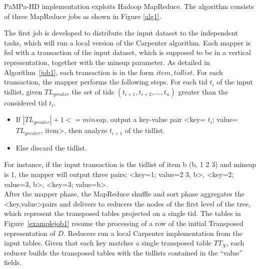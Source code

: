



PaMPa-HD implementation exploits Hadoop MapReduce.
The algorithm consists of three MapReduce jobs as shown in Figure \ref{alg1}.

The first job is developed to distribute the input dataset to the independent tasks,
which will run a local version of the Carpenter algorithm. Each mapper is fed
with a transaction of the input dataset, which is supposed to be in a vertical
representation, together with the minsup parameter. As detailed in Algorithm~\ref{job1}, each transaction is in the form $item,tidlist$. 
For each transaction, the mapper performs 
the following steps. For each tid $t_{i}$ of the input tidlist, given $TL_{greater}$ the set of tids $(t_{i+1},t_{i+2},...,t_{n})$ greater than the considered tid $t_{i}$.
\begin{itemize}
\item If $|TL_{greater}|+1 <= minsup$, output a key-value pair \textless key= $t_{i}$; value= $TL_{greater}$, item\textgreater, then analyze $t_{i+1}$ of the tidlist.
 \item Else discard the tidlist.
\end {itemize}
 For instance, if the input transaction is the tidlist of item b (b, 1 2 3) and
 minsup is 1, the mapper will output three pairs:  \textless key=1; value=2 3,
 b\textgreater,  \textless  key=2; value=3, b\textgreater,  \textless  key=3;
 value=b\textgreater .\\
 After the mapper phase, the MapReduce shuffle and sort phase aggregates the
 \textless key,value\textgreater pairs and delivers to reducers the nodes of the
 first level of the tree, which represent the transposed tables projected on a
 single tid. The tables in Figure~\ref{examplejob1} resume the processing of a row of the initial Transposed  representation of $D$.
 Reducers run a local Carpenter implementation from the input
 tables. Given that each key matches a single transposed table $TT_{X}$, each reducer builds the transposed tables with the tidlists contained in the ``value'' fields. 
 
